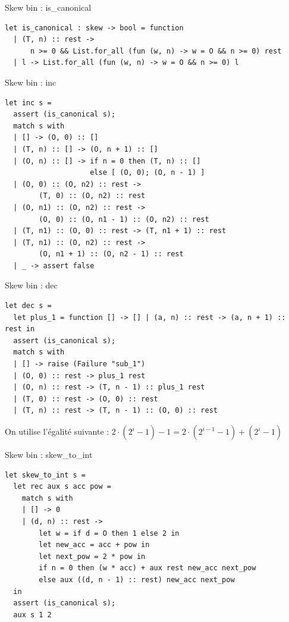 \documentclass{beamer}
\begin{document}
\begin{frame}[fragile]{Skew bin : is\_canonical}
\begin{lstlisting}
let is_canonical : skew -> bool = function
  | (T, n) :: rest ->
      n >= 0 && List.for_all (fun (w, n) -> w = O && n >= 0) rest
  | l -> List.for_all (fun (w, n) -> w = O && n >= 0) l
\end{lstlisting}
\end{frame}

\begin{frame}[fragile]{Skew bin : inc}
\begin{lstlisting}
let inc s =
  assert (is_canonical s);
  match s with
  | [] -> (O, 0) :: []
  | (T, n) :: [] -> (O, n + 1) :: []
  | (O, n) :: [] -> if n = 0 then (T, n) :: [] 
                    else [ (O, 0); (O, n - 1) ]
  | (O, 0) :: (O, n2) :: rest -> 
        (T, 0) :: (O, n2) :: rest
  | (O, n1) :: (O, n2) :: rest -> 
        (O, 0) :: (O, n1 - 1) :: (O, n2) :: rest
  | (T, n1) :: (O, 0) :: rest -> (T, n1 + 1) :: rest
  | (T, n1) :: (O, n2) :: rest -> 
        (O, n1 + 1) :: (O, n2 - 1) :: rest
  | _ -> assert false
\end{lstlisting}
\end{frame}


\begin{frame}[fragile]{Skew bin : dec}
\begin{lstlisting}
let dec s =
  let plus_1 = function [] -> [] | (a, n) :: rest -> (a, n + 1) :: rest in
  assert (is_canonical s);
  match s with
  | [] -> raise (Failure "sub_1")
  | (O, 0) :: rest -> plus_1 rest
  | (O, n) :: rest -> (T, n - 1) :: plus_1 rest
  | (T, 0) :: rest -> (O, 0) :: rest
  | (T, n) :: rest -> (T, n - 1) :: (O, 0) :: rest
\end{lstlisting}
On utilise l'égalité suivante :
$2 \cdot (2^i -1) - 1 = 2 \cdot (2^{i - 1} - 1) + (2^{i} - 1)$

\end{frame}

\begin{frame}[fragile]{Skew bin : skew\_to\_int}
\begin{lstlisting}
let skew_to_int s =
  let rec aux s acc pow =
    match s with
    | [] -> 0
    | (d, n) :: rest ->
        let w = if d = O then 1 else 2 in
        let new_acc = acc + pow in
        let next_pow = 2 * pow in
        if n = 0 then (w * acc) + aux rest new_acc next_pow
        else aux ((d, n - 1) :: rest) new_acc next_pow
  in
  assert (is_canonical s);
  aux s 1 2
\end{lstlisting}
\end{frame}
\end{document}
